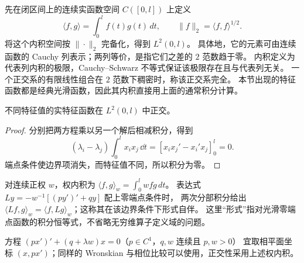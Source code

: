 \begin{definition}[平方平均空间与完全性]\label{def:l2-completion}
先在闭区间上的连续实函数空间 $C([0,l])$ 上定义
\[
 \langle f,g\rangle=\int_0^l f(t)g(t)\,dt,
 \qquad\|f\|_2=\langle f,f\rangle^{1/2}.
\]
将这个内积空间按 $\|\cdot\|_2$ 完备化，得到 $L^2(0,l)$。
具体地，它的元素可由连续函数的 Cauchy 列表示；两列等价，是指它们之差的 $2$ 范数趋于零。
内积定义为代表列内积的极限，Cauchy--Schwarz 不等式保证该极限存在且与代表列无关。
一个正交系的有限线性组合在 $2$ 范数下稠密时，称该正交系完全。
本节出现的特征函数都是经典光滑函数，因此其内积直接用上面的通常积分计算。
\end{definition}

\begin{proposition}
不同特征值的实特征函数在 $L^2(0,l)$ 中正交。
\end{proposition}
\begin{proof}
分别把两方程乘以另一个解后相减积分，得到
\[
 (\lambda_i-\lambda_j)\int_0^lx_i x_j\,\dd t
 =[x_i x_j'-x_i'x_j]_0^l=0.
\]
端点条件使边界项消失，而特征值不同，所以积分为零。
\end{proof}
\begin{definition}[权内积与形式自伴]
对连续正权 $w$，权内积为 $\langle f,g\rangle_w=\displaystyle\int_0^l wf g\,dt$。
表达式 $Ly=-w^{-1}[(py')'+qy]$ 配上零端点条件时，
两次分部积分给出 $\langle Lf,g\rangle_w=\langle f,Lg\rangle_w$；这称其在该边界条件下形式自伴。
这里“形式”指对光滑零端点函数的积分恒等式，不省略无穷维算子定义域的问题。
\end{definition}
方程 $(p x')'+(q+\lambda w)x=0$（$p\in C^1$，$q,w$ 连续且 $p,w>0$）
宜取相平面坐标 $(x,px')$；同样的 Wronskian 与相位比较可以使用，正交性采用上述权内积。
